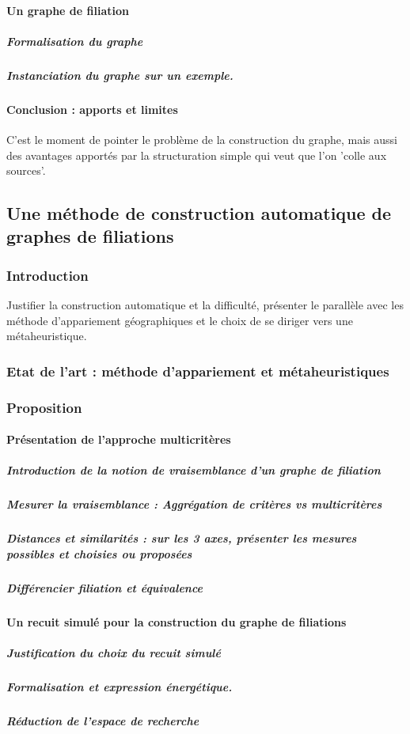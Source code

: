 \documentclass[a4paper,10pt]{article}
\begin{document}
\paragraph{Un graphe de filiation}
\subparagraph{Formalisation du graphe}
\subparagraph{Instanciation du graphe sur un exemple.}
\paragraph{Conclusion : apports et limites}
C'est le moment de pointer le problème de la construction du graphe, mais aussi des avantages apportés par
la structuration simple qui veut que l'on 'colle aux sources'.
\subsection{Une méthode de construction automatique de graphes de filiations}
\subsubsection{Introduction}
Justifier la construction automatique et la difficulté, présenter le parallèle avec
les méthode d'appariement géographiques et le choix de se diriger vers une métaheuristique.

\subsubsection{Etat de l'art : méthode d'appariement et métaheuristiques}

\subsubsection{Proposition}
\paragraph{Présentation de l'approche multicritères}
\subparagraph{Introduction de la notion de vraisemblance d'un graphe de filiation}
\subparagraph{Mesurer la vraisemblance : Aggrégation de critères vs multicritères}
\subparagraph{Distances et similarités : sur les 3 axes, présenter les mesures possibles et choisies ou proposées}
\subparagraph{Différencier filiation et équivalence}

\paragraph{Un recuit simulé pour la construction du graphe de filiations}
\subparagraph{Justification du choix du recuit simulé}
\subparagraph{Formalisation et expression énergétique.}
\subparagraph{Réduction de l'espace de recherche}
\end{document}
